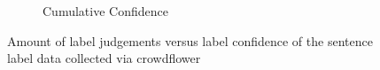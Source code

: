 \begin{figure}[h]
\begin{subfigure}[b]{0.43\textwidth}
        \caption{Cumulative Confidence}
\label{fig:sentence-data-judgement-confidence-cumulative}
    \end{subfigure}
    \caption{Amount of label judgements versus label confidence of the sentence label data collected via crowdflower}
\label{fig:sentence-data-judgements}
\end{figure}
